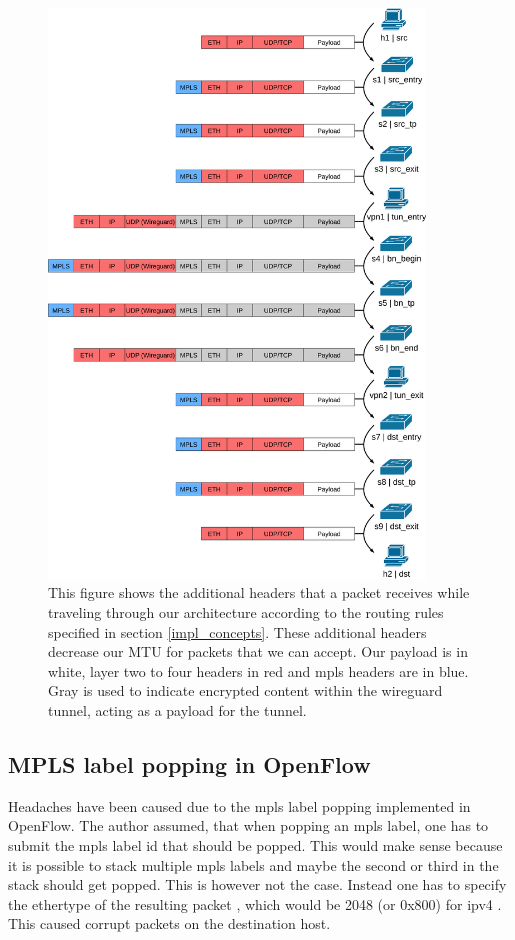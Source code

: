 \begin{figure}[hp]
  \centering
  \includegraphics[width=10cm]{images/chapter_6/packet_structure.png}
  \caption[Additional headers of packets]{This figure shows the additional headers that a packet receives while traveling through our architecture according to the routing rules specified in section \ref{impl_concepts}. These additional headers decrease our MTU for packets that we can accept. Our payload is in white, layer two to four headers in red and \acrshort{mpls} headers are in blue. Gray is used to indicate encrypted content within the wireguard tunnel, acting as a payload for the tunnel.}
  \label{fig:packet_structure}
\end{figure}

\subsection{MPLS label popping in OpenFlow}
Headaches have been caused due to the \acrshort{mpls} label popping implemented in OpenFlow. The author assumed, that when popping an \acrshort{mpls} label, one has to submit the \acrshort{mpls} label id that should be popped. This would make sense because it is possible to stack multiple \acrshort{mpls} labels and maybe the second or third in the stack should get popped. This is however not the case. Instead one has to specify the ethertype of the resulting packet \cite{openflow}, which would be 2048 (or 0x800) for \acrshort{ipv4} \cite{rfc7042}. This caused corrupt packets on the destination host.

